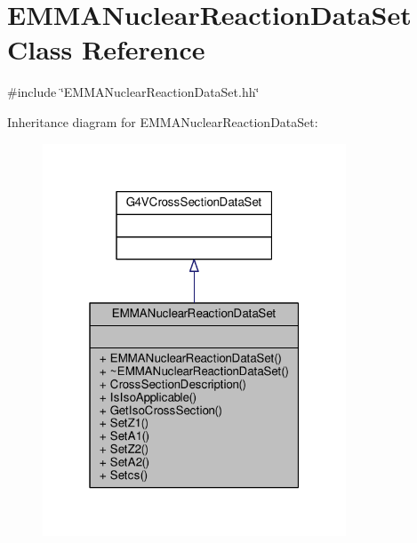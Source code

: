 \hypertarget{classEMMANuclearReactionDataSet}{}\section{E\+M\+M\+A\+Nuclear\+Reaction\+Data\+Set Class Reference}
\label{classEMMANuclearReactionDataSet}


{\ttfamily \#include \char`\"{}E\+M\+M\+A\+Nuclear\+Reaction\+Data\+Set.\+hh\char`\"{}}



Inheritance diagram for E\+M\+M\+A\+Nuclear\+Reaction\+Data\+Set\+:
\nopagebreak
\begin{figure}[H]
\begin{center}
\leavevmode
\includegraphics[width=256pt]{classEMMANuclearReactionDataSet__inherit__graph}
\end{center}
\end{figure}


